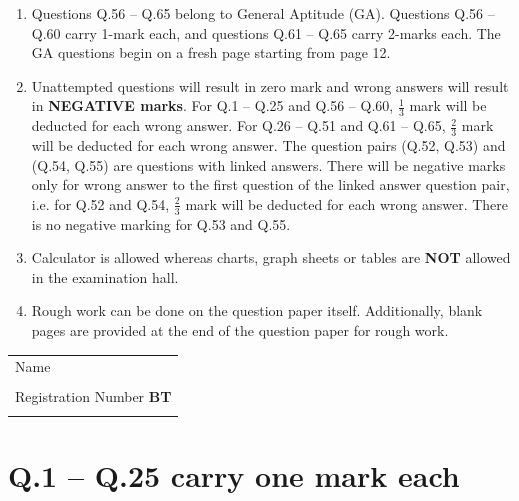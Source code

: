 \documentclass[journal,12pt,onecolumn]{IEEEtran}
\begin{document}
\begin{enumerate}
    \item Questions Q.56 – Q.65 belong to General Aptitude (GA). Questions Q.56 – Q.60 carry 1-mark each, and questions Q.61 – Q.65 carry 2-marks each. The GA questions begin on a fresh page starting from page 12.
    \item Unattempted questions will result in zero mark and wrong answers will result in \textbf{NEGATIVE marks}. For Q.1 – Q.25 and Q.56 – Q.60, $\tfrac{1}{3}$ mark will be deducted for each wrong answer. For Q.26 – Q.51 and Q.61 – Q.65, $\tfrac{2}{3}$ mark will be deducted for each wrong answer. The question pairs (Q.52, Q.53) and (Q.54, Q.55) are questions with linked answers. There will be negative marks only for wrong answer to the first question of the linked answer question pair, i.e. for Q.52 and Q.54, $\tfrac{2}{3}$ mark will be deducted for each wrong answer. There is no negative marking for Q.53 and Q.55.
    \item Calculator is allowed whereas charts, graph sheets or tables are \textbf{NOT} allowed in the examination hall.
    \item Rough work can be done on the question paper itself. Additionally, blank pages are provided at the end of the question paper for rough work.
\end{enumerate}

\vfill

\noindent\begin{tabular}{|p{7cm}|}
\hline
Name \\[1.5cm] \\
\hline
Registration Number \hfill \textbf{BT} \\[1.5cm] \\
\hline
\end{tabular}

\section*{Q.1 – Q.25 carry one mark each}
\end{document}
